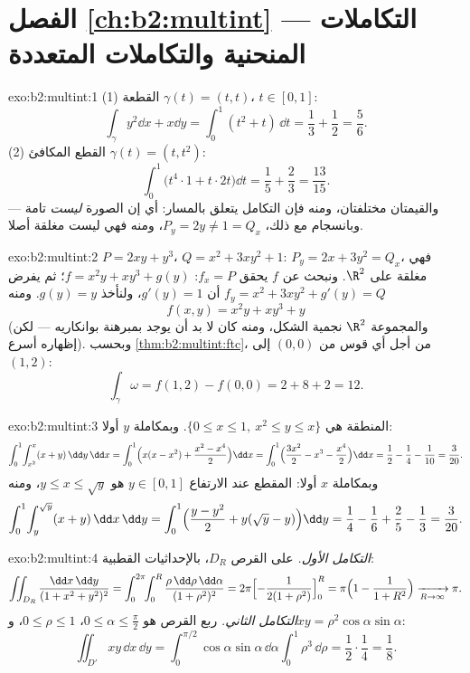 \section*{الفصل \ref{ch:b2:multint} --- التكاملات المنحنية والتكاملات المتعددة}

\begin{solution}{exo:b2:multint:1}
(1) القطعة $\gamma(t) = (t, t)$، $t \in [0,1]$:
\[
\int_\gamma y^2\dd x + x\dd y
= \int_0^1 (t^2 + t)\,\dd t = \frac13 + \frac12 = \frac56 .
\]
(2) القطع المكافئ $\gamma(t) = (t, t^2)$:
\[
\int_0^1 \bigl(t^4\cdot 1 + t\cdot 2t\bigr)\dd t
= \frac15 + \frac23 = \frac{13}{15} .
\]
والقيمتان مختلفتان، ومنه فإن التكامل يتعلق بالمسار: أي إن الصورة
\emph{ليست} تامة --- وبانسجام مع ذلك، $P_y = 2y \neq 1 = Q_x$، ومنه فهي ليست مغلقة
أصلا.
\end{solution}

\begin{solution}{exo:b2:multint:2}
$P = 2xy + y^3$، $Q = x^2 + 3xy^2 + 1$: $P_y = 2x + 3y^2 = Q_x$، فهي مغلقة على $\R^2$. ونبحث عن $f$ يحقق
$f_x = P$: $f = x^2y + xy^3
+ g(y)$؛ ثم يفرض $f_y = x^2 + 3xy^2 + g'(y) = Q$ أن $g'(y) = 1$، ولنأخذ $g(y) = y$. ومنه
\[
f(x, y) = x^2y + xy^3 + y
\]
 (والمجموعة $\R^2$ نجمية الشكل، ومنه كان لا بد أن يوجد 
بمبرهنة بوانكاريه --- لكن إظهاره أسرع). وبحسب \cref{thm:b2:multint:ftc}، من أجل أي قوس
من $(0,0)$ إلى $(1,2)$:
\[
\int_\gamma\omega = f(1, 2) - f(0, 0) = 2 + 8 + 2 = 12 .
\]
\end{solution}

\begin{solution}{exo:b2:multint:3}
المنطقة هي $\{0 \leq x \leq 1,\ x^2 \leq y \leq x\}$.
وبمكاملة $y$ أولا:
\[
\int_0^1\!\int_{x^2}^{x}(x + y)\,\dd y\,\dd x
= \int_0^1\Bigl(x(x - x^2)
+ \frac{x^2 - x^4}{2}\Bigr)\dd x
= \int_0^1\Bigl(\frac{3x^2}{2} - x^3 - \frac{x^4}{2}\Bigr)\dd x
= \frac12 - \frac14 - \frac1{10} = \frac{3}{20} .
\]
وبمكاملة $x$ أولا: المقطع عند الارتفاع $y \in [0, 1]$ هو $y \leq x \leq
\sqrt y$، ومنه
\[
\int_0^1\!\int_{y}^{\sqrt y}(x + y)\,\dd x\,\dd y
= \int_0^1\Bigl(\frac{y - y^2}{2}
+ y(\sqrt y - y)\Bigr)\dd y
= \frac14 - \frac16 + \frac25 - \frac13 = \frac{3}{20} .
\]
\end{solution}

\begin{solution}{exo:b2:multint:4}
\emph{التكامل الأول.} على القرص $D_R$، بالإحداثيات القطبية:
\[
\iint_{D_R}\frac{\dd x\,\dd y}{(1 + x^2 + y^2)^2}
= \int_0^{2\pi}\!\!\int_0^R
\frac{\rho\,\dd\rho\,\dd\alpha}{(1 + \rho^2)^2}
= 2\pi\Bigl[-\frac{1}{2(1 + \rho^2)}\Bigr]_0^R
= \pi\Bigl(1 - \frac{1}{1 + R^2}\Bigr)
\xrightarrow[R \to \infty]{} \pi .
\]
\emph{التكامل الثاني.} ربع القرص هو $0 \leq \alpha \leq
\frac\pi2$، $0 \leq \rho \leq 1$، و$xy =
\rho^2\cos\alpha\sin\alpha$:
\[
\iint_{D'}xy\,\dd x\,\dd y
= \int_0^{\pi/2}\!\!\cos\alpha\sin\alpha\,\dd\alpha
\int_0^1 \rho^3\,\dd\rho
= \frac12\cdot\frac14 = \frac18 .
\]
\end{solution}


